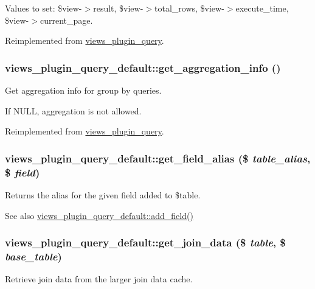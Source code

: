 Values to set: \$view-\/$>$result, \$view-\/$>$total\_\-rows, \$view-\/$>$execute\_\-time, \$view-\/$>$current\_\-page. 

Reimplemented from \hyperlink{classviews__plugin__query_a9de6da4d1c256b88f8dc1a630332abe9}{views\_\-plugin\_\-query}.\hypertarget{classviews__plugin__query__default_a07be1c437984cac29d608041e8378c2f}{
\subsubsection[{get\_\-aggregation\_\-info}]{\setlength{\rightskip}{0pt plus 5cm}views\_\-plugin\_\-query\_\-default::get\_\-aggregation\_\-info ()}}
\label{classviews__plugin__query__default_a07be1c437984cac29d608041e8378c2f}
Get aggregation info for group by queries.

If NULL, aggregation is not allowed. 

Reimplemented from \hyperlink{classviews__plugin__query_a0628a8a185bd8d5717887dcdd9dae7db}{views\_\-plugin\_\-query}.\hypertarget{classviews__plugin__query__default_a1861c9cb9fd6ed490a35dfb8b6bbe119}{
\subsubsection[{get\_\-field\_\-alias}]{\setlength{\rightskip}{0pt plus 5cm}views\_\-plugin\_\-query\_\-default::get\_\-field\_\-alias (\$ {\em table\_\-alias}, \/  \$ {\em field})}}
\label{classviews__plugin__query__default_a1861c9cb9fd6ed490a35dfb8b6bbe119}
Returns the alias for the given field added to \$table.

\begin{DoxySeeAlso}{See also}
\hyperlink{classviews__plugin__query__default_afeb9c22de8c015682431b41288248dbb}{views\_\-plugin\_\-query\_\-default::add\_\-field()} 
\end{DoxySeeAlso}
\hypertarget{classviews__plugin__query__default_a60d456b86d39fad9ffc9acedde13201d}{
\subsubsection[{get\_\-join\_\-data}]{\setlength{\rightskip}{0pt plus 5cm}views\_\-plugin\_\-query\_\-default::get\_\-join\_\-data (\$ {\em table}, \/  \$ {\em base\_\-table})}}
\label{classviews__plugin__query__default_a60d456b86d39fad9ffc9acedde13201d}
Retrieve join data from the larger join data cache.



